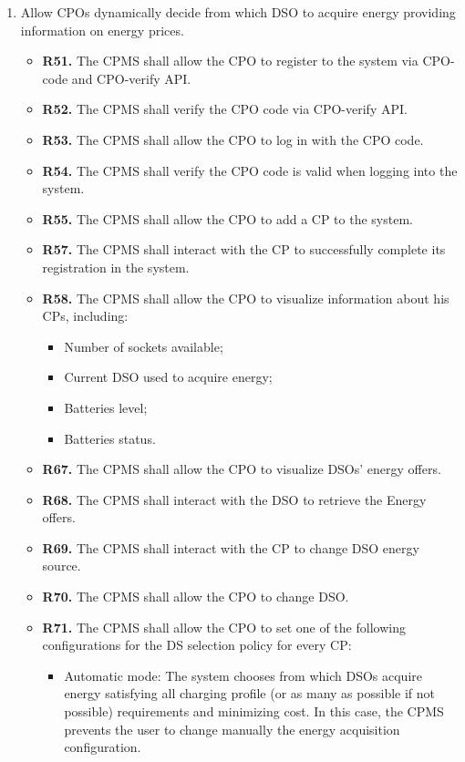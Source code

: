 \documentclass{Configuration_Files/PoliMi3i_thesis}
\begin{document}
\begin{enumerate}[label=\textbf{G\arabic*}]
    \item Allow CPOs dynamically decide from which DSO to acquire energy providing information on energy prices.
        \begin{itemize}
            \item \textbf{R51.} The CPMS shall allow the CPO to register to the system via CPO-code and CPO-verify API.
            \item \textbf{R52.} The CPMS shall verify the CPO code via CPO-verify API.
            \item \textbf{R53.} The CPMS shall allow the CPO to log in with the CPO code.
            \item \textbf{R54.} The CPMS shall verify the CPO code is valid when logging into the system.
            \item \textbf{R55.} The CPMS shall allow the CPO to add a CP to the system.
            \item \textbf{R57.} The CPMS shall interact with the CP to successfully complete its registration in the system.
            \item \textbf{R58.} The CPMS shall allow the CPO to visualize information about his CPs, including:
                \begin{itemize}
                    \item Number of sockets available;
                    \item Current DSO used to acquire energy;
                    \item Batteries level;
                    \item Batteries status.
                \end{itemize}
            \item \textbf{R67.} The CPMS shall allow the CPO to visualize DSOs' energy offers.
            \item \textbf{R68.} The CPMS shall interact with the DSO to retrieve the Energy offers.
            \item \textbf{R69.} The CPMS shall interact with the CP to change DSO energy source.
            \item \textbf{R70.} The CPMS shall allow the CPO to change DSO.
            \item \textbf{R71.} The CPMS shall allow the CPO to set one of the following configurations for the DS selection policy for every CP:
                \begin{itemize}
                    \item Automatic mode: The system chooses from which DSOs acquire energy satisfying all charging profile (or as many as possible if not possible) requirements and minimizing cost. In this case, the CPMS prevents the user to change manually the energy acquisition configuration.

\end{itemize}
\end{itemize}
\end{enumerate}
\end{document}
